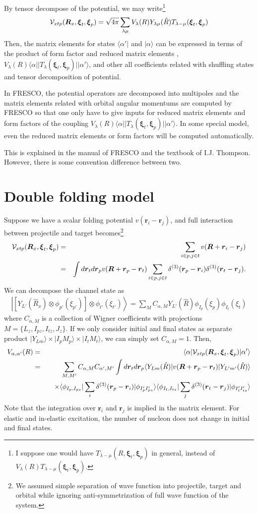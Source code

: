 \documentclass[11pt]{book}
\def\bm{\boldsymbol}
\def\vr{{\bm r}}
\def\la{\langle}
\def\ra{\rangle}
\newcommand{\bea}{\begin{eqnarray}}
\newcommand{\eea}{\end{eqnarray}}
\newcommand{\no}{\nonumber \\}
\begin{document}
By tensor decompose of the potential, we may write\footnote{I suppose
	one would have $T_{\lambda -\mu}(R,{\bm \xi}_t,{\bm \xi}_p)$ in general,
	instead of  $V_\lambda(R)T_{\lambda -\mu}({\bm \xi}_t,{\bm \xi}_p)$.
}
\bea 
{\cal V}_{xtp}({\bm R}_x,{\bm \xi}_t,{\bm \xi}_p)
=\sqrt{4\pi} \sum_{\lambda\mu} V_\lambda(R) Y_{\lambda\mu}(\hat{R}) T_{\lambda -\mu}({\bm \xi}_t,{\bm \xi}_p)
\eea 
Then, the matrix elements for states $\la \alpha'|$ and $|\alpha\ra$
can be expressed in terms of the product of form factor and reduced matrix elements
, $V_\lambda(R)\la \alpha||T_{\lambda}({\bm \xi}_t,{\bm \xi}_p)||\alpha'\ra $, and 
other all coefficients related with shuffling states and tensor decomposition of  
potential. 





In FRESCO, 
the potential operators are decomposed into multipoles and the matrix elements related with
orbital angular momentums are computed by FRESCO so that one only have to give inputs for 
reduced matrix elements and form factors of the coupling $V_\lambda(R)\la \alpha||T_{\lambda}({\bm \xi}_t,{\bm \xi}_p)||\alpha'\ra $. In some special model, even the reduced matrix elements or
form factors will be computed automatically.   

This is explained in the manual of FRESCO and the textbook of I.J. Thompson.
However, there is some convention difference between two. 

\section{Double folding model}
Suppose we have a scalar folding potential $v(\vr_i-\vr_j)$, and full interaction between
projectile and target becomes\footnote{We assumed simple separation of wave function 
	into projectile, target and orbital while ignoring anti-symmetrization of full wave function
	of the system.
} 
\bea 
{\cal V}_{xtp}({\bm R}_x,{\bm \xi}_t,{\bm \xi}_p)&=&\sum_{i\in p, j\in t} v({\bm R}+\vr_i-\vr_j) \no 
&=& \int d{\bm r}_t d{\bm r}_p   v({\bm R}+\vr_p-\vr_t) 
\sum_{i\in p, j\in t} \delta^{(3)}(\vr_p-\vr_i)\delta^{(3)}(\vr_t-\vr_j)     .
\eea 
We can decompose the channel state as 
\bea 
\left| [Y_{L'}(\hat{R}_{x})\otimes \phi_{p'}(\xi_{p'})]\otimes \phi_{t'}(\xi_{t'})\right\ra
= \sum_{M} C_{\alpha,M} Y_{L'}(\hat{R}) \phi_{I_p}(\xi_p)\phi_{I_t}(\xi_t)
\eea 
where $C_{\alpha,M}$ is a collection of Wigner coefficients with projections $M=\{L_z,I_{pz},I_{tz}, J_z\}$.
If we only consider initial and final states as separate product $|Y_{L m}\ra\times |I_p M_p\ra \times |I_t M_t\ra$,
we can simply set $C_{\alpha,M}=1$.
Then,
\bea 
V_{\alpha,\alpha'}(R)&=& \la \alpha| {\cal V}_{xtp}({\bm R}_x,{\bm \xi}_t,{\bm \xi}_p)|\alpha'\ra \no 
&=& \sum_{M,M'} C_{\alpha,M}C_{\alpha',M'} 
\int d{\bm r}_t d{\bm r}_p   \la Y_{Lm}(\hat{R})| v({\bm R}+\vr_p-\vr_t) |Y_{L'm'}(\hat{R})\ra
\no & &  \quad \times  
\la \phi_{I_p,I_{pz} }|\sum_{i}  \delta^{(3)}(\vr_p-\vr_i) |\phi_{I'_p I'_{pz}}\ra 
\la \phi_{I_t,I_{tz}}|\sum_{j}  \delta^{(3)}(\vr_t-\vr_j) |\phi_{I'_t I'_{tz}}\ra    
\eea 
Note that the integration over $\vr_i$ and $\vr_j$ is implied in the matrix element.
For elastic and in-elastic excitation, the number of nucleon does not change in 
initial and final states. 
\end{document}
